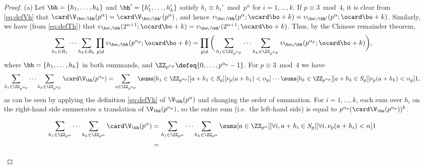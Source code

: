 \documentclass[12pt, reqno, twoside, letterpaper]{amsart}
\begin{document}
\begin{jetsam}
\begin{proof}
%
(a)
%
Let $\bh = \{h_1,\ldots,h_k\}$ and $\bh' = \{h_1',\ldots,h_k'\}$  
satisfy $h_i \equiv h_i' \bmod p^{\alpha}$ for $i = 1,\ldots,k$. 
%
If $p \equiv 3 \bmod 4$, it is clear from \eqref{eq:defVh} that 
$
 \card \V_{\bo \cup \bh}(p^{\alpha}) 
  = 
   \card \V_{\bo \cup \bh'}(p^{\alpha})
$, 
and hence 
$
 \upsilon_{\bo \cup \bh}(p^{\alpha};\ocard \bo + k)
 = 
  \upsilon_{\bo \cup \bh'}(p^{\alpha};\ocard \bo + k)
$.
%
Similarly, we have (from \eqref{eq:defTh}) that 
$
 \upsilon_{\bo \cup \bh}(2^{\alpha + 1};\ocard \bo + k) 
  = 
   \upsilon_{\bo \cup \bh'}(2^{\alpha + 1};\ocard \bo + k)
$.
%
Thus, by the Chinese remainder theorem, 
\[
 \sum_{h_1 \in R_1} 
  \cdots 
   \sum_{h_k \in R_k}
    \prod_{p \mid d} \upsilon_{\bo \cup \bh}(p^{\alpha_p};\ocard \bo + k)
      =
       \prod_{p \mid d} 
        \bigg(
         \sum_{h_1 \in \ZZ_{p^{\alpha_p}}}
          \cdots 
           \sum_{h_k \in \ZZ_{p^{\alpha_p}}}
            \upsilon_{\bo \cup \bh}(p^{\alpha_p};\ocard \bo + k) 
         \bigg),
\]
where $\bh = \{h_1,\ldots,h_k\}$ in both summands, and 
$\ZZ_{p^{\alpha_p}} \defeq \{0,\ldots,p^{\alpha_p} - 1\}$.
%
For $p \equiv 3 \bmod 4$ we have 
\[
 \sum_{h_1 \in \ZZ_{p^{\alpha_p}}}
  \cdots 
   \sum_{h_k \in \ZZ_{p^{\alpha_p}}}
    \card \V_{\bh}(p^{\alpha_p})
   =
   \sum_{a \in \ZZ_{p^{\alpha_p}}}
    \sums[h_1 \in \ZZ_{p^{\alpha_p}}][a + h_1 \in S_p][\nu_p(a + h_1) < \alpha_p]
     \cdots 
      \sums[h_k \in \ZZ_{p^{\alpha_p}}][a + h_k \in S_p][\nu_p(a + h_k) < \alpha_p] 1,
\]
as can be seen by applying the definition \eqref{eq:defVh} of 
$\V_{\bh}(p^{\alpha})$ and changing the order of summation.
%
For $i = 1,\ldots,k$, each sum over $h_i$ on the right-hand side 
enumerates a translation of $\V_{\bz}(p^{\alpha_p})$, so the 
entire sum (i.e.\ the left-hand side) is equal to 
$p^{\alpha_p}(\card \V_{\bz}(p^{\alpha_p}))^k$.
%
%
\begin{nixnix}
%
\begin{align*}
  \sum_{h_1 \in \ZZ_{p^{\alpha}}}
   \cdots 
    \sum_{h_k \in \ZZ_{p^{\alpha}}}
     \card \V_{\bh}(p^{\alpha})
  & = 
      \sum_{h_1 \in \ZZ_{p^{\alpha}}}
       \cdots 
        \sum_{h_k \in \ZZ_{p^{\alpha}}}
         \sums[a \in \ZZ_{p^{\alpha}}][\forall i, a + h_i \in S_p][\forall i, \nu_p(a + h_i) < \alpha] 1
 \\ 
  & = 

\end{align*}
\end{nixnix}
\end{proof}
\end{jetsam}
\end{document}
